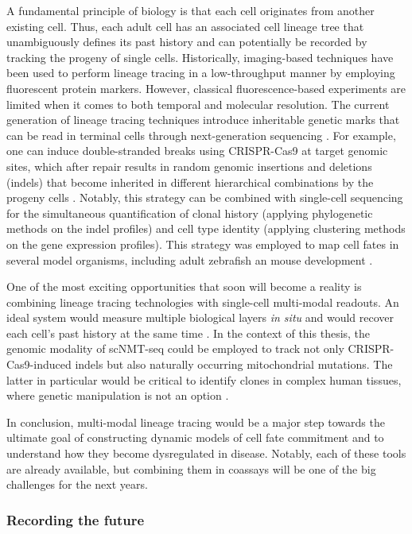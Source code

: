 A fundamental principle of biology is that each cell originates from another existing cell. Thus, each adult cell has an associated cell lineage tree that unambiguously defines its past history and can potentially be recorded by tracking the progeny of single cells. Historically, imaging-based techniques have been used to perform lineage tracing in a low-throughput manner by employing fluorescent protein markers. However, classical fluorescence-based experiments are limited when it comes to both temporal and molecular resolution. The current generation of lineage tracing techniques introduce inheritable genetic marks that can be read in terminal cells through next-generation sequencing \cite{Baron2019,Kester2018,McKenna2019}. For example, one can induce double-stranded breaks using CRISPR-Cas9 at target genomic sites, which after repair results in random genomic insertions and deletions (indels) that become inherited in different hierarchical combinations by the progeny cells \cite{Baron2019,Kester2018,McKenna2019}. Notably, this strategy can be combined with single-cell sequencing for the simultaneous quantification of clonal history (applying phylogenetic methods on the indel profiles) and cell type identity (applying clustering methods on the gene expression profiles). This strategy was employed to map cell fates in several model organisms, including adult zebrafish \cite{Alemany2018} an mouse development \cite{Chan2019}. 

One of the most exciting opportunities that soon will become a reality is combining lineage tracing technologies with single-cell multi-modal readouts. An ideal system would measure multiple biological layers \textit{in situ} and would recover each cell's past history at the same time \cite{McKenna2019}. In the context of this thesis, the genomic modality of scNMT-seq could be employed to track not only CRISPR-Cas9-induced indels but also naturally occurring mitochondrial mutations. The latter in particular would be critical to identify clones in complex human tissues, where genetic manipulation is not an option \cite{Ludwig2019}. 

In conclusion, multi-modal lineage tracing would be a major step towards the ultimate goal of constructing dynamic models of cell fate commitment and to understand how they become dysregulated in disease. Notably, each of these tools are already available, but combining them in coassays will be one of the big challenges for the next years.

\subsubsection{Recording the future} 

